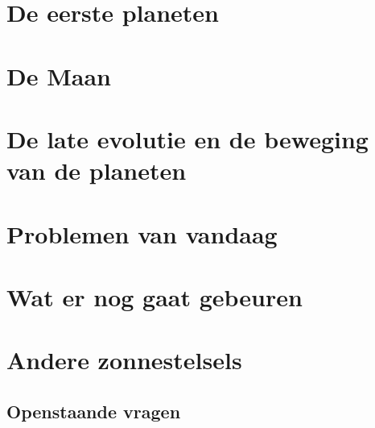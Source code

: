 \documentclass[11pt,fleqn]{book} %
\begin{document}
\chapter{De eerste planeten}
\chapter{De Maan}
\chapter{De late evolutie en de beweging van de planeten}
\chapter{Problemen van vandaag}
\chapter{Wat er nog gaat gebeuren}
\chapter{Andere zonnestelsels}

\section{Openstaande vragen}
\end{document}
